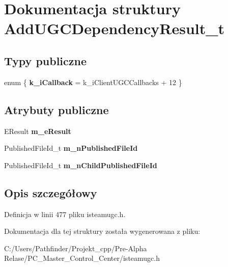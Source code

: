 \hypertarget{struct_add_u_g_c_dependency_result__t}{}\section{Dokumentacja struktury Add\+U\+G\+C\+Dependency\+Result\+\_\+t}
\label{struct_add_u_g_c_dependency_result__t}
\subsection*{Typy publiczne}
\begin{DoxyCompactItemize}
\item 
\mbox{\label{struct_add_u_g_c_dependency_result__t_afa0b9cd789043a95300a86465f952e21}} 
enum \{ {\bfseries k\+\_\+i\+Callback} = k\+\_\+i\+Client\+U\+G\+C\+Callbacks + 12
 \}
\end{DoxyCompactItemize}
\subsection*{Atrybuty publiczne}
\begin{DoxyCompactItemize}
\item 
\mbox{\label{struct_add_u_g_c_dependency_result__t_a18c758ec2360bf67cd58a0d52edd5f9c}} 
E\+Result {\bfseries m\+\_\+e\+Result}
\item 
\mbox{\label{struct_add_u_g_c_dependency_result__t_ac5327346a819281b39d3a496795f8cb9}} 
Published\+File\+Id\+\_\+t {\bfseries m\+\_\+n\+Published\+File\+Id}
\item 
\mbox{\label{struct_add_u_g_c_dependency_result__t_a5a74198c4b02417d5d164010b29a009a}} 
Published\+File\+Id\+\_\+t {\bfseries m\+\_\+n\+Child\+Published\+File\+Id}
\end{DoxyCompactItemize}


\subsection{Opis szczegółowy}


Definicja w linii 477 pliku isteamugc.\+h.



Dokumentacja dla tej struktury została wygenerowana z pliku\+:\begin{DoxyCompactItemize}
\item 
C\+:/\+Users/\+Pathfinder/\+Projekt\+\_\+cpp/\+Pre-\/\+Alpha Relase/\+P\+C\+\_\+\+Master\+\_\+\+Control\+\_\+\+Center/isteamugc.\+h\end{DoxyCompactItemize}
